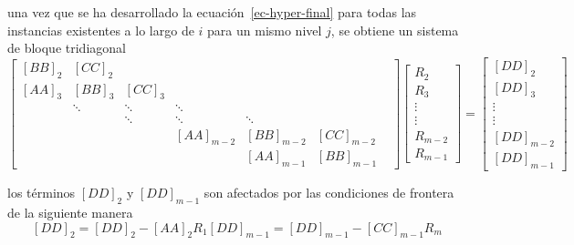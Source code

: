 \documentclass[letterpaper, openright, 12pt]{book}
\begin{document}
    una vez que se ha desarrollado la ecuación~\ref{ec-hyper-final} para
    todas las instancias existentes a lo largo de $i$ para un mismo nivel
    $j$, se obtiene un sistema de bloque tridiagonal
    \begin{equation}
        \begin{bmatrix}
        \left[ BB \right]_2 & \left[ CC \right]_2 & & & & \\
        \left[AA\right]_3 & \left[BB\right]_3 & \left[CC\right]_3 & & & \\
        & \ddots & \ddots &  \ddots & & \\
        & & \ddots & \ddots & \ddots & & \\
        & & & \left[AA\right]_{m-2} & \left[BB\right]_{m-2} &
            \left[CC\right]_{m-2}\\
        & & & & \left[AA\right]_{m-1} & \left[BB\right]_{m-1}
        \end{bmatrix}
        \begin{bmatrix}
        R_{2}\\
        R_{3}\\
        \vdots\\
        \vdots\\
        R_{m-2}\\
        R_{m-1}
        \end{bmatrix}
        = \begin{bmatrix}
        \left[DD\right]_2\\
        \left[DD\right]_3\\
        \vdots\\
        \vdots\\
        \left[DD\right]_{m-2}\\
        \left[DD\right]_{m-1}
        \end{bmatrix}
    \end{equation}

    los términos $\left[DD\right]_2$ y $\left[DD\right]_{m - 1}$ son
    afectados por las condiciones de frontera de la siguiente manera
    \begin{subequations}
        \begin{equation*}
            \left[DD\right]_2 = \left[DD\right]_2 - \left[AA\right]_2 R_1
        \end{equation*}
        \begin{equation*}
            \left[DD\right]_{m - 1} = \left[DD\right]_{m - 1}
                - \left[CC\right]_{m - 1} R_{m}
        \end{equation*}
    \end{subequations}
\end{document}
